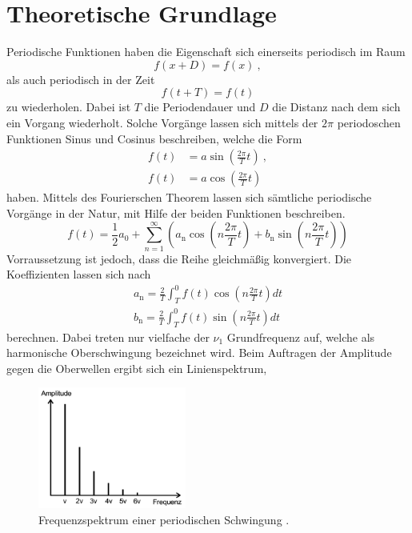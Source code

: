 \section{Theoretische Grundlage}
\label{sec:Theorie}
Periodische Funktionen haben die Eigenschaft sich einerseits periodisch im Raum
\begin{equation}
  f(x + D) = f(x) \ ,
  \label{eqn:f(x)}
\end{equation}
als auch periodisch in der Zeit
\begin{equation}
  f(t + T) =f(t)
  \label{eqn:f(t)}
\end{equation}
zu wiederholen. Dabei ist $T$ die Periodendauer und $D$ die Distanz nach dem sich ein Vorgang wiederholt. Solche Vorgänge lassen sich mittels der $2 \pi$ periodoschen Funktionen Sinus und Cosinus beschreiben, welche die Form
\begin{eqnarray}
  f(t) & = a \sin \left( \frac{2 \pi}{T} t \right) \ ,	\\
  f(t) & = a \cos \left( \frac{2 \pi}{T} t \right)
  \label{eqn:sin}
\end{eqnarray}
haben. Mittels des Fourierschen Theorem lassen sich sämtliche periodische Vorgänge in der Natur, mit Hilfe der beiden Funktionen beschreiben.
\begin{equation}
  f(t) = \frac{1}{2} a_0 + \sum^{\infty}_{n=1} \left( a_\text{n} \cos \left(n \frac{2 \pi}{T} t \right) + b_\text{n} \sin \left(n \frac{2 \pi}{T} t \right) \right)
  \label{eqn:fourier}
\end{equation}
Vorraussetzung ist jedoch, dass die Reihe gleichmäßig konvergiert. Die Koeffizienten lassen sich nach
\begin{eqnarray}
  a_\text{n} = \frac{2}{T} \int^0_T f(t) \cos \left(n \frac{2 \pi}{T} t \right) dt	\\
  b_\text{n} = \frac{2}{T} \int^0_T f(t) \sin \left(n \frac{2 \pi}{T} t \right) dt
  \label{eqn:Koef}
\end{eqnarray}
berechnen. Dabei treten nur vielfache der $\nu_1$ Grundfrequenz auf, welche als harmonische Oberschwingung bezeichnet wird. Beim Auftragen der Amplitude gegen die Oberwellen ergibt sich ein Linienspektrum,
\begin{figure}
  \centering
  \includegraphics[height=4cm]{picture/Frequenzspektrum.png}
  \caption{Frequenzspektrum einer periodischen Schwingung \cite{sample}.}
  \label{fig:fre}
\end{figure}
